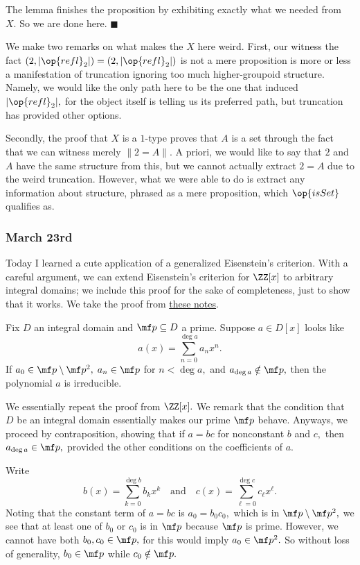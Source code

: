 The lemma finishes the proposition by exhibiting exactly what we needed from $X.$ So we are done here. $\blacksquare$

We make two remarks on what makes the $X$ here weird. First, our witness the fact $(2,|\op{refl}_2|)=(2,|\op{refl}_2|)$ is not a mere proposition is more or less a manifestation of truncation ignoring too much higher-groupoid structure. Namely, we would like the only path here to be the one that induced $|\op{refl}_2|,$ for the object itself is telling us its preferred path, but truncation has provided other options.

Secondly, the proof that $X$ is a $1$-type proves that $A$ is a set through the fact that we can witness merely $\lVert2=A\rVert.$ A priori, we would like to say that $2$ and $A$ have the same structure from this, but we cannot actually extract $2=A$ due to the weird truncation. However, what we were able to do is extract any information about structure, phrased as a mere proposition, which $\op{isSet}$ qualifies as.

\subsubsection{March 23rd}
Today I learned a cute application of a generalized Eisenstein's criterion. With a careful argument, we can extend Eisenstein's criterion for $\ZZ[x]$ to arbitrary integral domains; we include this proof for the sake of completeness, just to show that it works. We take the proof from \href{https://crypto.stanford.edu/pbc/notes/numbertheory/eisenstein.html}{these notes}.
\begin{theorem}
    Fix $D$ an integral domain and $\mf p\subseteq D$ a prime. Suppose $a\in D[x]$ looks like
    \[a(x)=\sum_{n=0}^{\deg a}a_nx^n.\]
    If $a_0\in\mf p\setminus\mf p^2,$ $a_n\in\mf p$ for $n<\deg a,$ and $a_{\deg a}\notin\mf p,$ then the polynomial $a$ is irreducible.
\end{theorem}
We essentially repeat the proof from $\ZZ[x].$ We remark that the condition that $D$ be an integral domain essentially makes our prime $\mf p$ behave. Anyways, we proceed by contraposition, showing that if $a=bc$ for nonconstant $b$ and $c,$ then $a_{\deg a}\in\mf p,$ provided the other conditions on the coefficients of $a.$

Write
\[b(x)=\sum_{k=0}^{\deg b}b_kx^k\quad\text{and}\quad c(x)=\sum_{\ell=0}^{\deg c}c_\ell x^\ell.\]
Noting that the constant term of $a=bc$ is $a_0=b_0c_0,$ which is in $\mf p\setminus\mf p^2,$ we see that at least one of $b_0$ or $c_0$ is in $\mf p$ because $\mf p$ is prime. However, we cannot have both $b_0,c_0\in\mf p,$ for this would imply $a_0\in\mf p^2.$ So without loss of generality, $b_0\in\mf p$ while $c_0\notin\mf p.$

